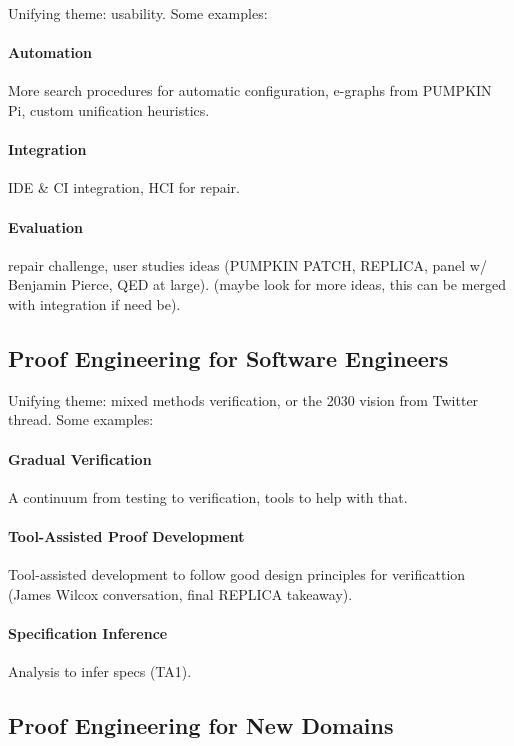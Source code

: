 Unifying theme: usability. Some examples:

\paragraph{Automation} More search procedures for automatic configuration, e-graphs from PUMPKIN Pi, custom unification heuristics.

\paragraph{Integration} IDE \& CI integration, HCI for repair.

\paragraph{Evaluation} repair challenge, user studies ideas (PUMPKIN PATCH, REPLICA, panel w/ Benjamin Pierce, QED at large). (maybe look for more ideas, this can be merged with integration if need be).

\subsection*{Proof Engineering for Software Engineers}

Unifying theme: mixed methods verification, or the 2030 vision from Twitter thread. Some examples:

\paragraph{Gradual Verification} A continuum from testing to verification, tools to help with that.

\paragraph{Tool-Assisted Proof Development} Tool-assisted development to follow good design principles for verificattion (James Wilcox conversation, final REPLICA takeaway).

\paragraph{Specification Inference} Analysis to infer specs (TA1).

\subsection*{Proof Engineering for New Domains}

